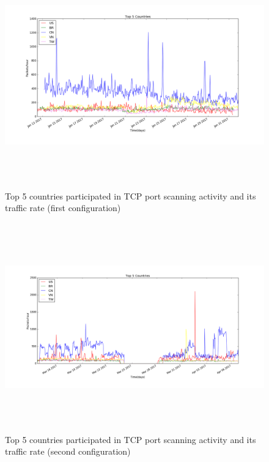 \begin{figure}[p]
\centering
\includegraphics[width=16cm, height=9cm]{images/top5_countries_tcp_withouthoneypot1.png}
\caption{Top 5 countries participated in TCP port scanning activity and its traffic rate (first configuration)}
\centering
\includegraphics[width=16cm, height=9cm]{images/top5countries_tcp_march2.png}
\caption{Top 5 countries participated in TCP port scanning activity and its traffic rate (second configuration)}
\end{figure}
\begin{table}[t!]
    \centering
    \caption{Top 5 countries participated in TCP port scanning activity at first configuration}
\end{table}
